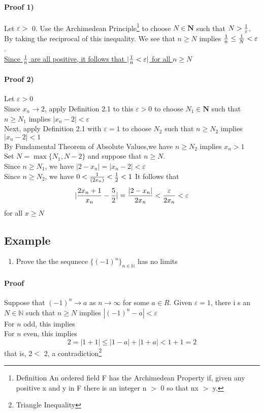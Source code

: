\documentclass{report}
\begin{document}
\paragraph{Proof 1)}
Let $\varepsilon >$ 0. Use the Archimedean Principle\footnote{Definition An ordered field F has the Archimedean Property if, given any positive x and y in F there is an integer n $>$ 0 so that nx $>$ y.} to choose $N\in \mathbf{N}$ such that $N > {1\over \varepsilon}$. By taking the reciprocal of this inequality. We see that $n \geq N$ implies ${1\over n}\leq{1\over N}<\varepsilon$. \\
\underline{Since $1\over n$ are all positive, it follows that $|{{1\over n} < \varepsilon}|$ for all $n\geq N$}
\paragraph{Proof 2)}
Let $\varepsilon > 0$ \\Since $x_n \to 2$, apply Definition 2.1 to this $\varepsilon > 0$ to choose $N_1 \in \mathbf{N}$ such that $n\geq N_1$ implies $|x_n - 2|<\varepsilon$\\Next, apply Definition 2.1 with $\varepsilon = 1$ to choose $N_2$ such that $n\geq N_2$ implies $|x_n - 2| < 1$\\
By Fundamental Theorem of Absolute Values,we have $n\geq N_2$ implies $x_n >1$\\
Set $N = \max\{N_1,N-2\}$ and suppose that $n\geq N$. \\
Since $n\geq N_1$, we have $|2-x_n| = |x_n-2| < \varepsilon$\\
Since $n\geq N_2$, we have $0<{1\over (2x_n)}< {1\over 2} < 1$ It follows that
$$|{{{2x_n+1}\over{x_n}} - {5\over 2}}| = {{|2-x_n|}\over {2x_n}} <{{\varepsilon}\over {2x_n}} <\varepsilon$$
for all $x\geq N$

\subsection{Example}
\begin{enumerate}
    \item Prove the the sequnece $\{(-1)^n\}_{n\in \mathbb{N}}$ has no limits
  
\end{enumerate}
\paragraph{Proof}
Suppose that $(-1)^n \to a$ as $n\to \infty$ for some $a\in R$. Given $\varepsilon = 1$, there i s an $N\in \mathbb N$ such that $n \geq N$ implies $|(-1)^n -a| <\varepsilon$\\
For $n$ odd, this implies \\
For $n$ even, this implies \\
$$ 2 = |1+1|\leq{|1-a|+|1+a|}<1 + 1= 2$$
that is, 2$<$ 2, a contradiction\footnote{Triangle Inequality}
\end{document}
